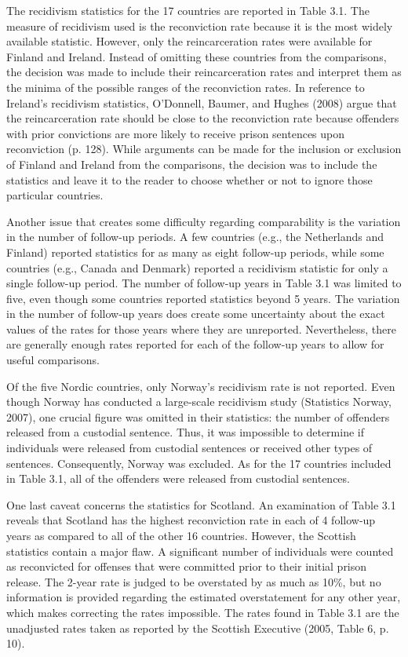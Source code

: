 The recidivism statistics for the 17 countries are reported in Table 3.1.  The measure of recidivism used is the reconviction rate because it is the most widely available statistic.  However, only the reincarceration rates were available for Finland and Ireland.  Instead of omitting these countries from the comparisons, the decision was made to include their reincarceration rates and interpret them as the minima of the possible ranges of the reconviction rates.  In reference to Ireland's recidivism statistics, O'Donnell, Baumer, and Hughes (2008) argue that the reincarceration rate should be close to the reconviction rate because offenders with prior convictions are more likely to receive prison sentences upon reconviction (p. 128).  While arguments can be made for the inclusion or exclusion of Finland and Ireland from the comparisons, the decision was to include the statistics and leave it to the reader to choose whether or not to ignore those particular countries.

Another issue that creates some difficulty regarding comparability is the variation in the number of follow-up periods.  A few countries (e.g., the Netherlands and Finland) reported statistics for as many as eight follow-up periods, while some countries (e.g., Canada and Denmark) reported a recidivism statistic for only a single follow-up period.  The number of follow-up years in Table 3.1 was limited to five, even though some countries reported statistics beyond 5 years.  The variation in the number of follow-up years does create some uncertainty about the exact values of the rates for those years where they are unreported.  Nevertheless, there are generally enough rates reported for each of the follow-up years to allow for useful comparisons.

Of the five Nordic countries, only Norway's recidivism rate is not reported.  Even though Norway has conducted a large-scale recidivism study (Statistics Norway, 2007), one crucial figure was omitted in their statistics: the number of offenders released from a custodial sentence.  Thus, it was impossible to determine if individuals were released from custodial sentences or received other types of sentences.  Consequently, Norway was excluded.  As for the 17 countries included in Table 3.1, all of the offenders were released from custodial sentences.

One last caveat concerns the statistics for Scotland.  An examination of Table 3.1 reveals that Scotland has the highest reconviction rate in each of 4 follow-up years as compared to all of the other 16 countries.  However, the Scottish statistics contain a major flaw.  A significant number of individuals were counted as reconvicted for offenses that were committed prior to their initial prison release.  The 2-year rate is judged to be overstated by as much as 10\%, but no information is provided regarding the estimated overstatement for any other year, which makes correcting the rates impossible.  The rates found in Table 3.1 are the unadjusted rates taken as reported by the Scottish Executive (2005, Table 6, p. 10).

